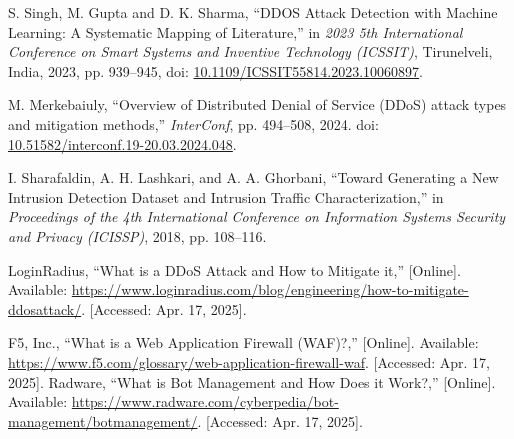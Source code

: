\documentclass[conference]{IEEEtran}
\begin{document}
\begin{thebibliography}{99}
S. Singh, M. Gupta and D. K. Sharma, ``DDOS Attack Detection with Machine Learning: A Systematic Mapping of Literature,'' in \textit{2023 5th International Conference on Smart Systems and Inventive Technology (ICSSIT)}, Tirunelveli, India, 2023, pp. 939--945, doi: \url{10.1109/ICSSIT55814.2023.10060897}.

M. Merkebaiuly, ``Overview of Distributed Denial of Service (DDoS) attack types and mitigation methods,'' \textit{InterConf}, pp. 494--508, 2024. doi: \url{10.51582/interconf.19-20.03.2024.048}.

I. Sharafaldin, A. H. Lashkari, and A. A. Ghorbani, ``Toward Generating a New Intrusion Detection Dataset and Intrusion Traffic Characterization,'' in \textit{Proceedings of the 4th International Conference on Information Systems Security and Privacy (ICISSP)}, 2018, pp. 108--116.

LoginRadius, ``What is a DDoS Attack and How to Mitigate it,'' [Online]. Available: \url{https://www.loginradius.com/blog/engineering/how-to-mitigate-ddosattack/}. [Accessed: Apr. 17, 2025].





F5, Inc., ``What is a Web Application Firewall (WAF)?,'' [Online]. Available: \url{https://www.f5.com/glossary/web-application-firewall-waf}. [Accessed: Apr. 17, 2025].
Radware, ``What is Bot Management and How Does it Work?,'' [Online]. Available: \url{https://www.radware.com/cyberpedia/bot-management/botmanagement/}. [Accessed: Apr. 17, 2025].




\end{thebibliography}
\end{document}
